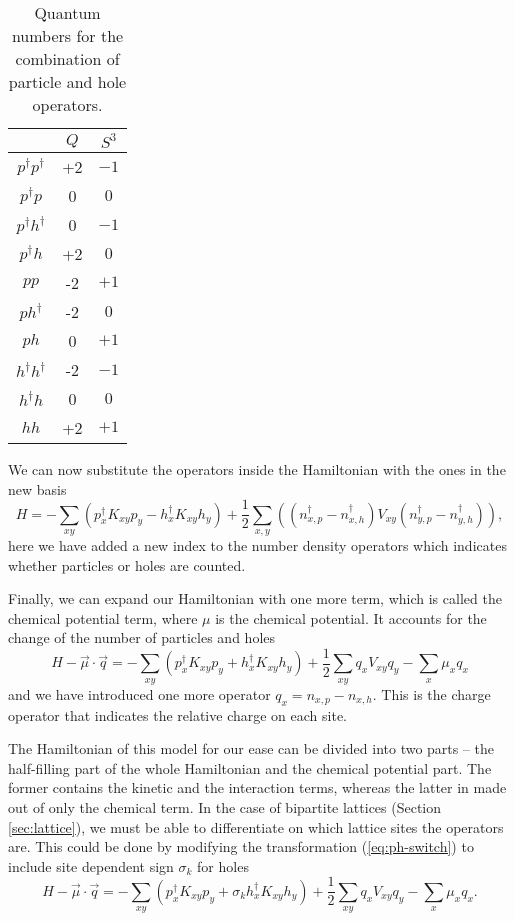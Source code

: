 \begin{table}[h]
    \centering
    \begin{tabular}{c|cc}
        & $Q$ & $S^3$ \\
    \hline
        $p^\dagger p^\dagger$ & +2 & $-1$ \\
        $p^\dagger p$ & 0 & $0$ \\
        $p^\dagger h^\dagger$ & 0 & $-1$ \\
        $p^\dagger h$ & +2 & $0$ \\
        $p p$ & -2 & $+1$ \\
        $p h^\dagger$ & -2 & $0$ \\
        $p h$ & 0 & $+1$ \\
        $h^\dagger h^\dagger$ & -2 & $-1$ \\
        $h^\dagger h$ & 0 & $0$ \\
        $h h$ & +2 & $+1$ \\
    \end{tabular}
    \caption{Quantum numbers for the combination of particle and hole operators.}
    \label{tab:ph-comb}
\end{table}

We can now substitute the operators inside the Hamiltonian with the ones in the new basis
\begin{equation}
    H = - \sum_{xy} \left( p^\dagger_x K_{xy} p_y - h^\dagger_x K_{xy} h_y \right) + \frac{1}{2} \sum_{x,y} \left( (n^\dagger_{x,p} - n^\dagger_{x,h}) V_{xy} (n^\dagger_{y,p} - n^\dagger_{y,h}) \right),
\end{equation}
here we have added a new index to the number density operators which indicates whether particles or holes are counted.

Finally, we can expand our Hamiltonian with one more term, which is called the chemical potential term, where $\mu$ is the chemical potential. It accounts for the change of the number of particles and holes
\begin{equation}
    H - \vec{\mu}\cdot\vec{q} = - \sum_{xy} \left( p^\dagger_x K_{xy} p_y + h^\dagger_x K_{xy} h_y \right) + \frac{1}{2}\sum_{xy} q_x V_{xy} q_y - \sum_{x} \mu_x q_x
\end{equation}
and we have introduced one more operator $q_x = n_{x,p} - n_{x,h}$. This is the charge operator that indicates the relative charge on each site. 

The Hamiltonian of this model for our ease can be divided into two parts -- the half-filling part of the whole Hamiltonian and the chemical potential part. The former contains the kinetic and the interaction terms, whereas the latter in made out of only the chemical term. In the case of bipartite lattices (Section \ref{sec:lattice}), we must be able to differentiate on which lattice sites the operators are. This could be done by modifying the transformation (\ref{eq:ph-switch}) to include site dependent sign $\sigma_k$ for holes
\begin{equation}
    H - \vec{\mu}\cdot\vec{q} = - \sum_{xy} \left( p^\dagger_x K_{xy} p_y + \sigma_k h^\dagger_x K_{xy} h_y \right) + \frac{1}{2}\sum_{xy} q_x V_{xy} q_y - \sum_{x} \mu_x q_x.
\end{equation}


